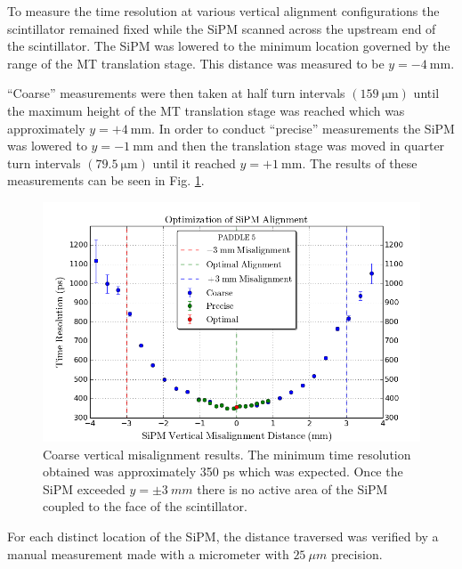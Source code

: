 To measure the time resolution at various vertical alignment configurations the scintillator remained fixed while the SiPM scanned across the upstream end of the scintillator. The SiPM was lowered to the minimum location governed by the range of the MT translation stage.  This distance was measured to be $y = \mathrm{-4~mm}$.  

``Coarse'' measurements were then taken at half turn intervals $(159\ \mathrm{\mu m})$ until the maximum height of the MT translation stage was reached which was approximately $y = +4\ \mathrm{mm}$.  In order to conduct ``precise'' measurements the SiPM was lowered to $y = \mathrm{-1~mm}$ and then the translation stage was moved in quarter turn intervals $(79.5\ \mathrm{\mu m})$ until it reached $y = \mathrm{+1~mm}$.  The results of these measurements can be seen in Fig. \ref{fig:sipm_va_coarse}.
	\begin{figure}[!htb]
		\centering
		\includegraphics[width=1.0\columnwidth]{misalignment/figs/sipm_va_coarse}
		\caption{Coarse vertical misalignment results.  The minimum time resolution obtained was approximately 350 ps which was expected.  Once the SiPM exceeded $y = \pm 3\ mm$ there is no active area of the SiPM coupled to the face of the scintillator.}
		\label{fig:sipm_va_coarse}
	\end{figure}
For each distinct location of the SiPM, the distance traversed was verified by a manual measurement made with a micrometer with $25\ \mu m$ precision.

